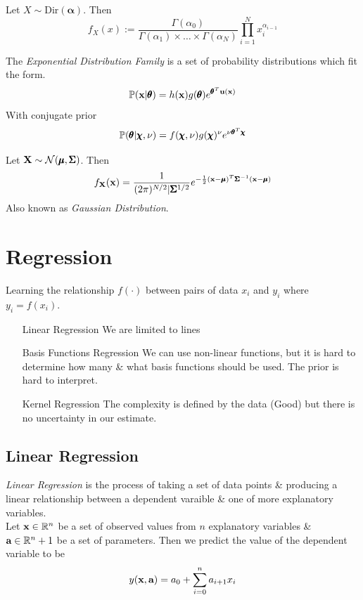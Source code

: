 \documentclass[11pt,a4paper]{article}
\begin{document}
Let $X\sim\text{Dir}(\pmb{\alpha})$. Then
$$f_X(x):=\dfrac{\Gamma(\alpha_0)}{\Gamma(\alpha_1)\times\dots\times\Gamma(\alpha_N)}\prod_{i=1}^Nx_i^{\alpha_{i-1}}$$

The \textit{Exponential Distribution Family} is a set of probability distributions which fit the form.
$$\mathbb{P}(\textbf{x}|\pmb{\theta})=h(\textbf{x})g(\pmb{\theta})e^{\pmb{\theta}^T\textbf{u}(\textbf{x})}$$
With conjugate prior
$$\mathbb{P}(\pmb{\theta}|\pmb{\chi},\nu)=f(\pmb{\chi},\nu)g(\pmb{\chi})^\nu e^{\nu\pmb{\theta}^T\pmb{\chi}}$$

Let $\textbf{X}\sim\mathcal{N}(\pmb{\mu},\pmb{\Sigma})$. Then
$$f_{\textbf{X}}(\textbf{x})=\dfrac{1}{(2\pi)^{N/2}|\pmb{\Sigma}^{1/2}}e^{-\frac{1}{2}(\textbf{x}-\pmb{\mu})^T\pmb{\Sigma}^{-1}(\textbf{x}-\pmb{\mu})}$$
\nb Also known as \textit{Gaussian Distribution}.

\section{Regression}

Learning the relationship $f(\cdot)$ between pairs of data $x_i$ and $y_i$ where $y_i=f(x_i)$.\\

\begin{itemize}
	\item[Linear Regression] We are limited to lines
	\item[Basis Functions Regression] We can use non-linear functions, but it is hard to determine how many \& what basis functions should be used. The prior is hard to interpret.
	\item[Kernel Regression] The complexity is defined by the data (Good) but there is no uncertainty in our estimate.
\end{itemize}

\subsection{Linear Regression}

\textit{Linear Regression} is the process of taking a set of data points \& producing a linear relationship between a dependent varaible \& one of more explanatory variables.\\
Let $\textbf{x}\in\mathbb{R}^n$ be a set of observed values from $n$ explanatory variables \& $\textbf{a}\in\mathbb{R}^n+1$ be a set of parameters. Then we predict the value of the dependent variable to be
$$y(\textbf{x},\textbf{a})=a_0+\sum\limits_{i=0}^na_{i+1}x_i$$
\end{document}
